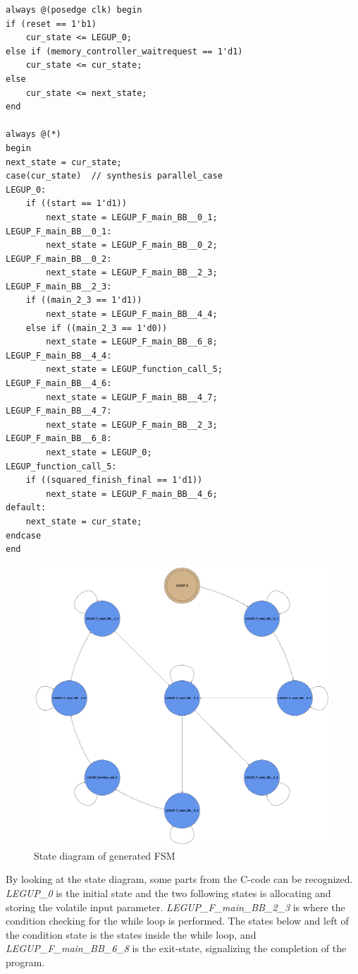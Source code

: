 \begin{lstlisting}[caption={Verilog FSM},label=lst:verilogfsm]
always @(posedge clk) begin
if (reset == 1'b1)
	cur_state <= LEGUP_0;
else if (memory_controller_waitrequest == 1'd1)
	cur_state <= cur_state;
else
	cur_state <= next_state;
end

always @(*)
begin
next_state = cur_state;
case(cur_state)  // synthesis parallel_case  
LEGUP_0:
	if ((start == 1'd1))
		next_state = LEGUP_F_main_BB__0_1;
LEGUP_F_main_BB__0_1:
		next_state = LEGUP_F_main_BB__0_2;
LEGUP_F_main_BB__0_2:
		next_state = LEGUP_F_main_BB__2_3;
LEGUP_F_main_BB__2_3:
	if ((main_2_3 == 1'd1))
		next_state = LEGUP_F_main_BB__4_4;
	else if ((main_2_3 == 1'd0))
		next_state = LEGUP_F_main_BB__6_8;
LEGUP_F_main_BB__4_4:
		next_state = LEGUP_function_call_5;
LEGUP_F_main_BB__4_6:
		next_state = LEGUP_F_main_BB__4_7;
LEGUP_F_main_BB__4_7:
		next_state = LEGUP_F_main_BB__2_3;
LEGUP_F_main_BB__6_8:
		next_state = LEGUP_0;
LEGUP_function_call_5:
	if ((squared_finish_final == 1'd1))
		next_state = LEGUP_F_main_BB__4_6;
default:
	next_state = cur_state;
endcase
end
\end{lstlisting}
\begin{figure}[hbpt]
\centering
\includegraphics[width=0.99\textwidth]{../figs/VerilogFSM.png}
\caption{\label{fig:verilogfsm}State diagram of generated FSM}
\end{figure}
By looking at the state diagram, some parts from the C-code can be recognized. \textit{LEGUP\_0} is the initial state and the two following states is allocating and storing the volatile input parameter. \textit{LEGUP\_F\_main\_BB\_2\_3} is where the condition checking for the while loop is performed. The states below and left of the condition state is the states inside the while loop, and \textit{LEGUP\_F\_main\_BB\_6\_8} is the exit-state, signalizing the completion of the program.


